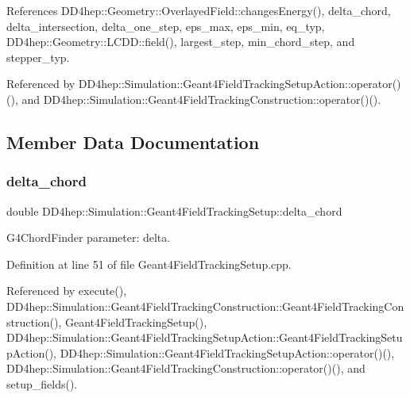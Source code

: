 References D\+D4hep\+::\+Geometry\+::\+Overlayed\+Field\+::changes\+Energy(), delta\+\_\+chord, delta\+\_\+intersection, delta\+\_\+one\+\_\+step, eps\+\_\+max, eps\+\_\+min, eq\+\_\+typ, D\+D4hep\+::\+Geometry\+::\+L\+C\+D\+D\+::field(), largest\+\_\+step, min\+\_\+chord\+\_\+step, and stepper\+\_\+typ.



Referenced by D\+D4hep\+::\+Simulation\+::\+Geant4\+Field\+Tracking\+Setup\+Action\+::operator()(), and D\+D4hep\+::\+Simulation\+::\+Geant4\+Field\+Tracking\+Construction\+::operator()().



\subsection{Member Data Documentation}
\hypertarget{struct_d_d4hep_1_1_simulation_1_1_geant4_field_tracking_setup_ac1e938991c5848a1a0cda7df729b5366}{}\label{struct_d_d4hep_1_1_simulation_1_1_geant4_field_tracking_setup_ac1e938991c5848a1a0cda7df729b5366} 
\subsubsection{\texorpdfstring{delta\+\_\+chord}{delta\_chord}}
{\footnotesize\ttfamily double D\+D4hep\+::\+Simulation\+::\+Geant4\+Field\+Tracking\+Setup\+::delta\+\_\+chord\hspace{0.3cm}{\ttfamily [protected]}}



G4\+Chord\+Finder parameter\+: delta. 



Definition at line 51 of file Geant4\+Field\+Tracking\+Setup.\+cpp.



Referenced by execute(), D\+D4hep\+::\+Simulation\+::\+Geant4\+Field\+Tracking\+Construction\+::\+Geant4\+Field\+Tracking\+Construction(), Geant4\+Field\+Tracking\+Setup(), D\+D4hep\+::\+Simulation\+::\+Geant4\+Field\+Tracking\+Setup\+Action\+::\+Geant4\+Field\+Tracking\+Setup\+Action(), D\+D4hep\+::\+Simulation\+::\+Geant4\+Field\+Tracking\+Setup\+Action\+::operator()(), D\+D4hep\+::\+Simulation\+::\+Geant4\+Field\+Tracking\+Construction\+::operator()(), and setup\+\_\+fields().

